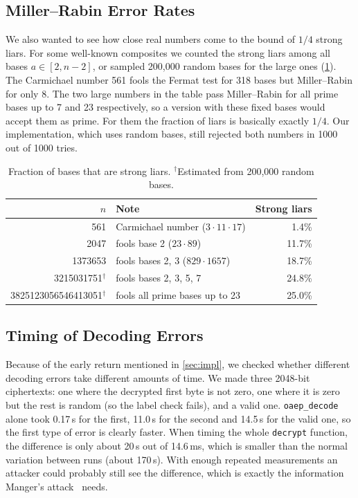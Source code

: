 \documentclass[runningheads]{llncs}
\newcommand{\code}[1]{\texttt{#1}}
\begin{document}
\subsection{Miller--Rabin Error Rates}

We also wanted to see how close real numbers come to the bound of $1/4$
strong liars. For some well-known composites we counted the strong liars
among all bases $a \in [2, n-2]$, or sampled 200{,}000 random bases for the
large ones (\cref{tab:mr}). The Carmichael number 561 fools the Fermat test
for 318 bases but Miller--Rabin for only 8. The two large numbers in the
table pass Miller--Rabin for all prime bases up to 7 and 23 respectively, so a
version with these fixed bases would accept them as prime. For them the
fraction of liars is basically exactly $1/4$. Our implementation, which uses
random bases, still rejected both numbers in 1000 out of 1000 tries.

\begin{table}[t]
\centering
\caption{Fraction of bases that are strong liars. $^\dagger$Estimated from
200{,}000 random bases.}\label{tab:mr}
\scriptsize
\begin{tabular}{@{}rlr@{}}
\toprule
$n$ & Note & Strong liars \\
\midrule
561        & Carmichael number ($3\cdot11\cdot17$) & 1.4\% \\
2047       & fools base 2 ($23\cdot89$) & 11.7\% \\
1373653    & fools bases 2, 3 ($829\cdot1657$) & 18.7\% \\
3215031751$^\dagger$ & fools bases 2, 3, 5, 7 & 24.8\% \\
3825123056546413051$^\dagger$ & fools all prime bases up to 23 & 25.0\% \\
\bottomrule
\end{tabular}
\end{table}

\subsection{Timing of Decoding Errors}\label{sec:timing}

Because of the early return mentioned in \cref{sec:impl}, we checked
whether different decoding errors take different amounts of time. We made
three 2048-bit ciphertexts: one where the decrypted first byte is not zero,
one where it is zero but the rest is random (so the label check fails), and
a valid one. \code{oaep\_decode} alone took 0.17\,\textmu s for the first,
11.0\,\textmu s for the second and 14.5\,\textmu s for the valid one, so the
first type of error is clearly faster. When timing the whole \code{decrypt}
function, the difference is only about 20\,\textmu s out of 14.6\,ms, which
is smaller than the normal variation between runs (about 170\,\textmu s).
With enough repeated measurements an attacker could probably still see the
difference, which is exactly the information Manger's
attack~\cite{manger2001} needs.
\end{document}
